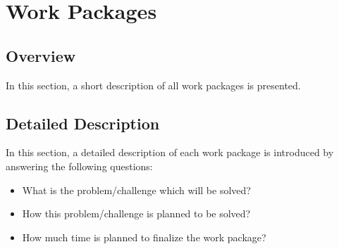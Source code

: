 \chapter{Work Packages}

\section{Overview}
In this section, a short description of all work packages is presented.

\section{Detailed Description}
In this section, a detailed description of each work package is introduced by answering the following questions:
\begin{itemize}
	\item What is the problem/challenge which will be solved?
	\item How this problem/challenge is planned to be solved?
	\item How much time is planned to finalize the work package?
\end{itemize}